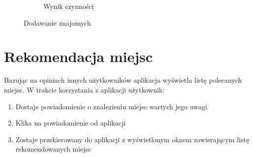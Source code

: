 \documentclass[10pt,twoside,a4paper]{report}
\begin{document}
\begin{figure}[h]
\begin{subfigure}{0.3\textwidth}
\caption{Wynik czynności}
\label{fig:friends3}
\end{subfigure}
\caption{Dodawanie znajomych}
\label{fig:podrecznik9}
\end{figure}
\FloatBarrier


\section{Rekomendacja miejsc}
Bazując na opiniach innych użytkowników aplikacja wyświetla listę polecanych miejsc. W trakcie korzystania z aplikacji użytkownik:
\begin{enumerate}
\item Dostaje powiadomienie o znalezieniu miejsc wartych jego uwagi
\item Klika na powiadomienie od aplikacji
\item Zostaje przekierowany do aplikacji z wyświetlonym oknem zawierającym listę rekomendowanych miejsc
\end{enumerate}
\end{document}
